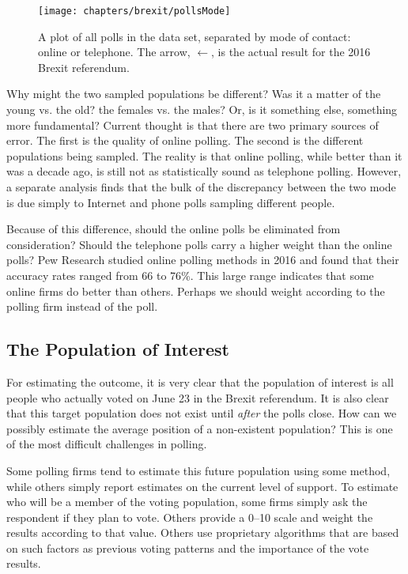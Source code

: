 \begin{figure}\centering
 \texttt{[image: chapters/brexit/pollsMode]}
 \caption[Brexit-2016 polls by mode]{A plot of all polls in the data set, separated by mode of contact: online or telephone. The arrow, $\leftarrow$, is the actual result for the 2016 Brexit referendum.}
 \label{fig:brexit-pollsMode}
\end{figure}


Why might the two sampled populations be different? Was it a matter of the young vs. the old? the females vs. the males? Or, is it something else, something more fundamental? Current thought is that there are two primary sources of error. The first is the quality of online polling. The second is the different populations being sampled. The reality is that online polling, while better than it was a decade ago, is still not as statistically sound as telephone polling.\cite{cohn-2019} However, a separate analysis finds that the bulk of the discrepancy between the two mode is due simply to Internet and phone polls sampling different people.\cite{singh-2016}

Because of this difference, should the online polls be eliminated from consideration? Should the telephone polls carry a higher weight than the online polls? Pew Research studied online polling methods in 2016 and found that their accuracy rates ranged from 66 to 76\%.\cite{kennedy-etal-2016} This large range indicates that some online firms do better than others. Perhaps we should weight according to the polling firm instead of the poll.







\subsection{The Population of Interest}
For estimating the outcome, it is very clear that the population of interest is all people who actually voted on June 23 in the Brexit referendum. It is also clear that this target population does not exist until \emph{after} the polls close. How can we possibly estimate the average position of a non-existent population? This is one of the most difficult challenges in polling. 

Some polling firms tend to estimate this future population using some method, while others simply report estimates on the current level of support. To estimate who will be a member of the voting population, some firms simply ask the respondent if they plan to vote. Others provide a 0--10 scale and weight the results according to that value. Others use proprietary algorithms that are based on such factors as previous voting patterns and the importance of the vote results. 

